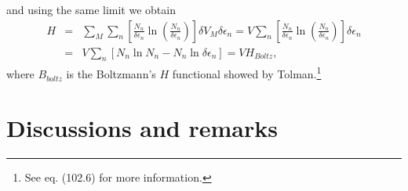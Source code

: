 \documentclass{article}
\begin{document}
{and using the same limit we obtain
\begin{eqnarray}
    H&=& \sum_M \sum_n
    \left[  
           \frac{N_{n}}{ \delta \epsilon_{n}} \ln 
           \left( 
                  \frac{N_{n}}{ \delta \epsilon_{n}}
           \right)
    \right] \delta V_M \delta \epsilon_{n}=V\sum_n
    \left[  
           \frac{N_{n}}{ \delta \epsilon_{n}} \ln 
           \left( 
                  \frac{N_{n}}{ \delta \epsilon_{n}}
           \right)
    \right] \delta \epsilon_{n} \nonumber \\
    &=& V \sum_n \left[N_n \ln N_n - N_n \ln \delta \epsilon_n  \right]=V H_{Boltz},\label{h-quantic4}
\end{eqnarray}
where $B_{boltz}$ is the Boltzmann's $H$ functional showed by Tolman.\footnote{See \cite{tolman} eq. (102.6) for more information.} }
\section{Discussions and remarks}
\end{document}
